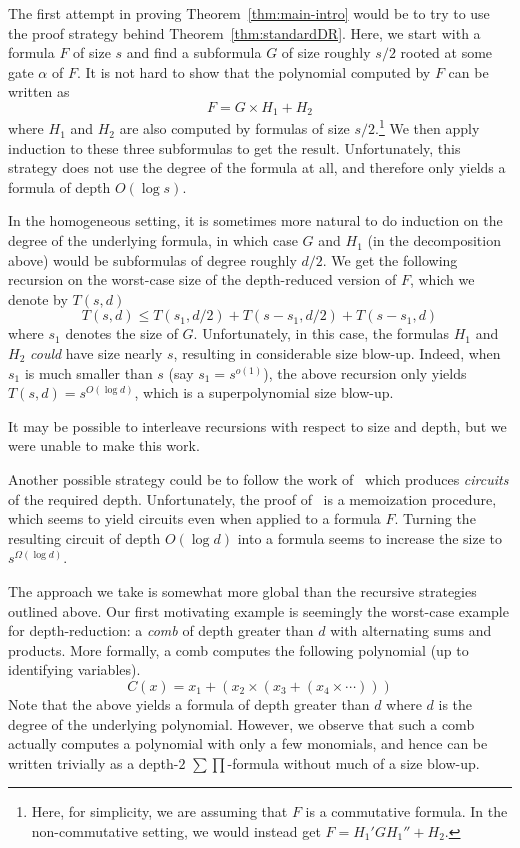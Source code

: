 \documentclass[10pt,a4paper]{article}
\begin{document}
The first attempt in proving Theorem~\ref{thm:main-intro} would be to try to use the proof strategy behind Theorem~\ref{thm:standardDR}. Here, we start with a formula $F$ of size $s$ and find a subformula $G$ of size roughly $s/2$ rooted at some gate $\alpha$ of $F$. It is not hard to show that the polynomial computed by $F$ can be written as
\[
F = G\times H_1 + H_2
\]
where $H_1$ and $H_2$ are also computed by formulas of size $s/2$.\footnote{Here, for simplicity, we are assuming that $F$ is a commutative formula. In the non-commutative setting, we would instead get $F = H_1' G H_1'' + H_2.$} We then apply induction to these three subformulas to get the result. Unfortunately, this strategy does not use the degree of the formula at all, and therefore only yields a formula of depth $O(\log s).$

In the homogeneous setting, it is sometimes more natural to do induction on the degree of the underlying formula, in which case $G$ and $H_1$ (in the decomposition above) would be subformulas of degree roughly $d/2$. We get the following recursion on the worst-case size of the depth-reduced version of $F$, which we denote by $T(s,d)$
\[
T(s,d) \leq T(s_1,d/2) + T(s-s_1,d/2) + T(s-s_1,d)
\]
where $s_1$ denotes the size of $G$. Unfortunately, in this case, the formulas $H_1$ and $H_2$ \emph{could} have size nearly $s$, resulting in considerable size blow-up. Indeed, when $s_1$ is much smaller than $s$ (say $s_1 = s^{o(1)}$), the above recursion only yields $T(s,d) = s^{O(\log d)}$, which is a superpolynomial size blow-up.

It may be possible to interleave recursions with respect to size and depth, but we were unable to make this work. 

Another possible strategy could be to follow the work of~\cite{VSBR} which produces \emph{circuits} of the required depth. Unfortunately, the proof of~\cite{VSBR} is a memoization procedure, which seems to yield circuits even when applied to a formula $F$. Turning the resulting circuit of depth $O(\log d)$ into a formula seems to increase the  size to $s^{\Omega(\log d)}$.

The approach we take is somewhat more global than the recursive strategies outlined above. Our first motivating example is seemingly the worst-case example for depth-reduction: a \emph{comb} of depth greater than $d$ with alternating sums and products. More formally, a comb computes the following polynomial (up to identifying variables).
\[
C(x) = x_1 + (x_2 \times (x_3 + ( x_4 \times \cdots )))
\]
Note that the above yields a formula of depth greater than $d$ where $d$ is the degree of the underlying polynomial. However, we observe that such a comb actually computes a polynomial with only a few monomials, and hence can be written trivially as a depth-$2$ $\sum\prod$-formula without much of a size blow-up. 
\end{document}
